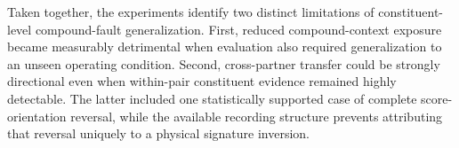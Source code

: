 Taken together, the experiments identify two distinct limitations of
constituent-level compound-fault generalization. First, reduced
compound-context exposure became measurably detrimental when evaluation
also required generalization to an unseen operating condition. Second,
cross-partner transfer could be strongly directional even when within-pair
constituent evidence remained highly detectable. The latter included one
statistically supported case of complete score-orientation reversal, while
the available recording structure prevents attributing that reversal
uniquely to a physical signature inversion.
